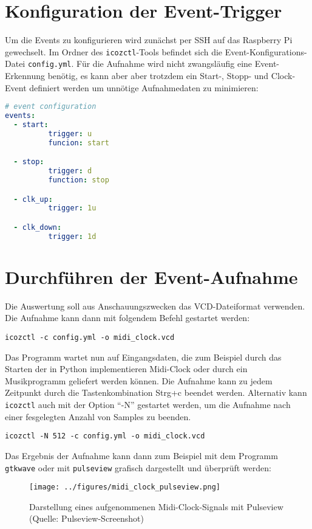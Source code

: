 \section{Konfiguration der Event-Trigger}
\label{ch:Anwendungsfall:sec:Event-Trigger}

Um die Events zu konfigurieren wird zunächst per SSH auf das Raspberry Pi gewechselt.  
Im Ordner des {\tt icozctl}-Tools befindet sich die Event-Konfigurations-Datei {\tt config.yml}.
Für die Aufnahme wird nicht zwangsläufig eine Event-Erkennung benötig, es kann aber aber trotzdem ein Start-, Stopp- und Clock-Event definiert werden um unnötige Aufnahmedaten zu minimieren:

\begin{lstlisting}[language=yaml]
# event configuration
events: 
  - start:
          trigger: u
          funcion: start

  - stop:
          trigger: d
          function: stop

  - clk_up:
          trigger: 1u

  - clk_down:
          trigger: 1d
\end{lstlisting}



\section{Durchführen der Event-Aufnahme}
\label{ch:Anwendungsfall:sec:Durchführung}

Die Auswertung soll aus Anschauungszwecken das VCD-Dateiformat verwenden.
Die Aufnahme kann dann mit folgendem Befehl gestartet werden:
\begin{verbatim}
icozctl -c config.yml -o midi_clock.vcd
\end{verbatim}

Das Programm wartet nun auf Eingangsdaten, die zum Beispiel durch das Starten der in Python implementieren Midi-Clock oder durch ein Musikprogramm geliefert werden können.
Die Aufnahme kann zu jedem Zeitpunkt durch die Tastenkombination Strg+c beendet werden.
Alternativ kann {\tt icozctl} auch mit der Option ``-N'' gestartet werden, um die Aufnahme nach einer fesgelegten Anzahl von Samples zu beenden. 
\begin{verbatim}
icozctl -N 512 -c config.yml -o midi_clock.vcd
\end{verbatim}
Das Ergebnis der Aufnahme kann dann zum Beispiel mit dem Programm {\tt gtkwave} oder mit {\tt pulseview} grafisch dargestellt und überprüft werden:
\clearpage 
\begin{figure}[h]
	\centering
	\captionsetup{justification=centering,margin=2cm}
		\texttt{[image: ../figures/midi\_clock\_pulseview.png]}
		\caption[Darstellung eines aufgenommenen Midi-Clock-Signals mit Pulseview]{Darstellung eines aufgenommenen Midi-Clock-Signals mit Pulseview (Quelle: Pulseview-Screenshot)}
	\label{fig:ice40_pmod_pins}
\end{figure}


